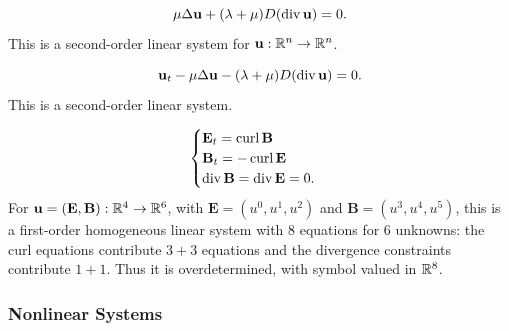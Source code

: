 \begin{example}
\label{ex:linear-elasticity-equilibrium}





$$\mu\Delta\mathbf{u} + (\lambda + \mu)D(\operatorname{div} \mathbf{u}) = 0.$$
This is a second-order linear system for $\mathbf{u}:\mathbb{R}^n\to\mathbb{R}^n$.
\end{example}

\begin{example}
\label{ex:linear-elasticity-evolution}





$$\mathbf{u}_t - \mu\Delta\mathbf{u} - (\lambda + \mu)D(\operatorname{div} \mathbf{u}) = 0.$$
This is a second-order linear system.
\end{example}

\begin{example}
\label{ex:maxwells-equations}





$$\begin{cases}
\mathbf{E}_t = \operatorname{curl} \mathbf{B} \\
\mathbf{B}_t = -\operatorname{curl} \mathbf{E} \\
\operatorname{div} \mathbf{B} = \operatorname{div} \mathbf{E} = 0.
\end{cases}$$
For $\mathbf{u}=(\mathbf{E},\mathbf{B}):\mathbb{R}^4\to\mathbb{R}^6$, with
$\mathbf{E}=(u^0,u^1,u^2)$ and $\mathbf{B}=(u^3,u^4,u^5)$, this is a
first-order homogeneous linear system with $8$ equations for $6$ unknowns:
the curl equations contribute $3+3$ equations and the divergence constraints
contribute $1+1$. Thus it is overdetermined, with symbol valued in $\mathbb{R}^8$.
\end{example}

\subsubsection{Nonlinear Systems}
\label{sec:examples-nonlinear-systems}

